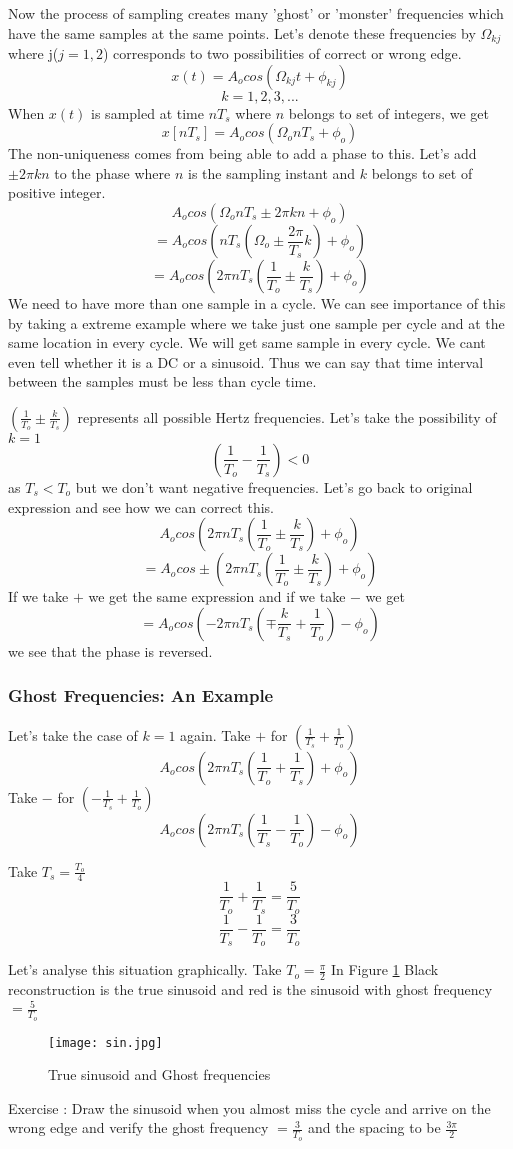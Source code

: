 Now the process of sampling creates many 'ghost' or 'monster' frequencies which have the same samples at the same points. Let's denote these frequencies by $\Omega_{kj}$ where j($j = 1,2$) corresponds to two possibilities of correct or wrong edge. $$x(t) = A_{o}cos(\Omega _{kj}t+\phi _{kj})$$ $$k = 1,2,3,...$$ When $x(t)$ is sampled at time $nT_{s}$ where $n$ belongs to set of integers, we get $$x[nT_{s}]=A_{o}cos(\Omega _{o}nT_{s}+\phi _{o})$$ The non-uniqueness comes from being able to add a phase to this. Let's add $\pm 2\pi kn$ to the phase where $n$ is the sampling instant and $k$ belongs to set of positive integer. $$A_{o}cos(\Omega _{o}nT_{s}\pm 2\pi kn+\phi _{o})$$ $$=A_{o}cos(nT_{s}(\Omega _{o}\pm \frac{2\pi}{T_{s}}k)+\phi _{o})$$ $$=A_{o}cos(2 \pi nT_{s}(\frac{1}{T_{o}}\pm \frac{k}{T_{s}})+\phi _{o})$$ We need to have more than one sample in a cycle. We can see importance of this by taking a extreme example where we take just one sample per cycle and at the same location in every cycle. We will get same sample in every cycle. We cant even tell whether it is a DC or a sinusoid. Thus we can say that time interval between the samples must be less than cycle time.

$(\frac{1}{T_{o}}\pm \frac{k}{T_{s}})$ represents all possible Hertz frequencies. Let's take the possibility of $k=1$ $$(\frac{1}{T_{o}}-\frac{1}{T_{s}}) < 0$$ as $T_{s}<T_{o}$ but we don't want negative frequencies. Let's go back to original expression and see how we can correct this.$$A_{o}cos(2 \pi nT_{s}(\frac{1}{T_{o}}\pm \frac{k}{T_{s}})+\phi _{o})$$ $$=A_{o}cos\pm(2 \pi nT_{s}(\frac{1}{T_{o}}\pm \frac{k}{T_{s}})+\phi _{o})$$ If we take $+$ we get the same expression and if we take $-$ we get $$=A_{o}cos(-2 \pi nT_{s}(\mp\frac{k}{T_{s}}+ \frac{1}{T_{o}})-\phi _{o})$$ we see that the phase is reversed.

\subsubsection{Ghost Frequencies: An Example}
Let's take the case of $k=1$ again. Take $+$ for $(\frac{1}{T_{s}}+ \frac{1}{T_{o}})$ $$A_{o}cos(2 \pi nT_{s}(\frac{1}{T_{o}}+ \frac{1}{T_{s}})+\phi _{o})$$Take $-$ for $(-\frac{1}{T_{s}}+ \frac{1}{T_{o}})$ $$A_{o}cos(2 \pi nT_{s}(\frac{1}{T_{s}}- \frac{1}{T_{o}})-\phi _{o})$$

Take $T_{s}=\frac{T_{o}}{4}$ $$\frac{1}{T_{o}}+ \frac{1}{T_{s}} = \frac{5}{T_{o}}$$ $$\frac{1}{T_{s}}- \frac{1}{T_{o}} = \frac{3}{T_{o}}$$

Let's analyse this situation graphically. Take $T_{o}=\frac{\pi}{2}$
In Figure \ref{fig:sin} Black reconstruction is the true sinusoid and red is the sinusoid with ghost frequency $ = \frac{5}{T_{o}}$

\newpage

\begin{figure}[ht]
\centering
\texttt{[image: sin.jpg]}
\caption{\label{fig:sin}True sinusoid and Ghost frequencies}
\end{figure}

Exercise : Draw the sinusoid when you almost miss the cycle and arrive on the wrong edge and verify the ghost frequency $ = \frac{3}{T_{o}}$ and the spacing to be $\frac{3\pi}{2}$

